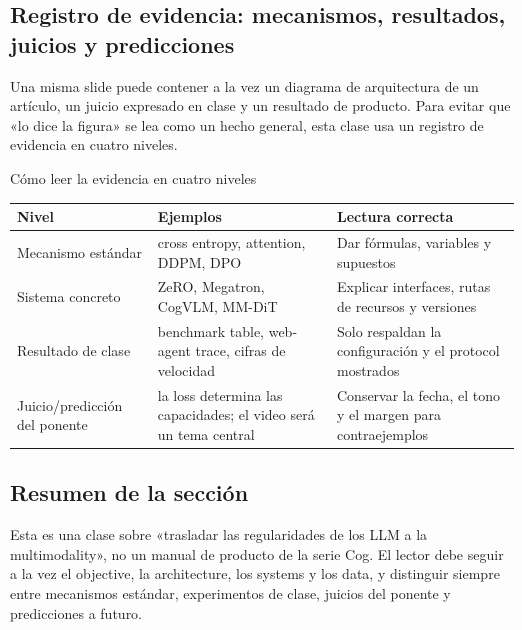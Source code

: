 
\subsection{Registro de evidencia: mecanismos, resultados, juicios y predicciones}

Una misma slide puede contener a la vez un diagrama de arquitectura de un artículo, un juicio expresado en clase y un resultado de producto. Para evitar que «lo dice la figura» se lea como un hecho general, esta clase usa un registro de evidencia en cuatro niveles.

\begin{knowledgebox}{Cómo leer la evidencia en cuatro niveles}
\begin{tabularx}{\textwidth}{L{0.18\textwidth} L{0.31\textwidth} X}
\toprule
Nivel & Ejemplos & Lectura correcta \\
\midrule
Mecanismo estándar & cross entropy, attention, DDPM, DPO & Dar fórmulas, variables y supuestos \\
Sistema concreto & ZeRO, Megatron, CogVLM, MM-DiT & Explicar interfaces, rutas de recursos y versiones \\
Resultado de clase & benchmark table, web-agent trace, cifras de velocidad & Solo respaldan la configuración y el protocol mostrados \\
Juicio/predicción del ponente & la loss determina las capacidades; el video será un tema central & Conservar la fecha, el tono y el margen para contraejemplos \\
\bottomrule
\end{tabularx}
\end{knowledgebox}

\subsection{Resumen de la sección}

Esta es una clase sobre «trasladar las regularidades de los LLM a la multimodality», no un manual de producto de la serie Cog. El lector debe seguir a la vez el objective, la architecture, los systems y los data, y distinguir siempre entre mecanismos estándar, experimentos de clase, juicios del ponente y predicciones a futuro.
